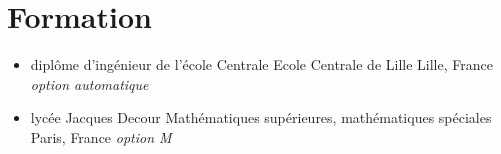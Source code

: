 \section{Formation}




\begin{itemize}

\item{\cventry
{}
{diplôme d'ingénieur de l'école Centrale }
{Ecole Centrale de Lille}
{Lille, France}
{\textit{option automatique}}
{}
}

\item{\cventry
{}
{lycée Jacques Decour}
{Mathématiques supérieures, mathématiques spéciales}
{Paris, France}
{\textit{option M}}
{}
}




\end{itemize}

\vspace{2pt}

